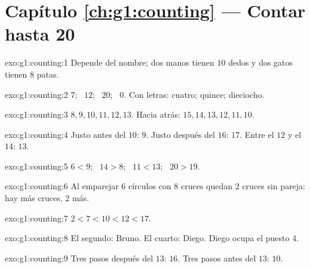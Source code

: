 \section*{Capítulo \ref{ch:g1:counting} --- Contar hasta 20}

\begin{solution}{exo:g1:counting:1}
Depende del nombre; dos manos tienen $10$ dedos y dos gatos
tienen $8$ patas.
\end{solution}

\begin{solution}{exo:g1:counting:2}
$7$; \ $12$; \ $20$; \ $0$. Con letras: cuatro; quince; dieciocho.
\end{solution}

\begin{solution}{exo:g1:counting:3}
$8, 9, 10, 11, 12, 13$. Hacia atrás: $15, 14, 13, 12, 11, 10$.
\end{solution}

\begin{solution}{exo:g1:counting:4}
Justo antes del $10$: $9$. Justo después del $16$: $17$. Entre el $12$ y el
$14$: $13$.
\end{solution}

\begin{solution}{exo:g1:counting:5}
$6 < 9$; \ $14 > 8$; \ $11 < 13$; \ $20 > 19$.
\end{solution}

\begin{solution}{exo:g1:counting:6}
Al emparejar $6$ círculos con $8$ cruces quedan $2$ cruces sin
pareja: hay más cruces, $2$ más.
\end{solution}

\begin{solution}{exo:g1:counting:7}
$2 < 7 < 10 < 12 < 17$.
\end{solution}

\begin{solution}{exo:g1:counting:8}
El segundo: Bruno. El cuarto: Diego. Diego ocupa el puesto $4$.
\end{solution}

\begin{solution}{exo:g1:counting:9}
Tres pasos después del $13$: $16$. Tres pasos antes del $13$: $10$.
\end{solution}
